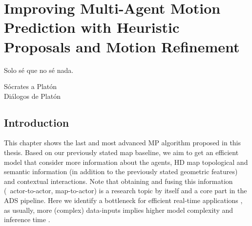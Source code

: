 % 
% 
% 
% 
% 
% 
% 

\chapter{Improving Multi-Agent Motion Prediction with Heuristic Proposals and Motion Refinement}
\label{cha:improving_multi_agent}

\begin{FraseCelebre}
	\begin{Frase}
		Solo sé que no sé nada.
	\end{Frase}
	\begin{Fuente}
		Sócrates a Platón \\
		Diálogos de Platón
	\end{Fuente}
\end{FraseCelebre}

\section{Introduction}
\label{sec:7_introduction}

This chapter shows the last and most advanced \ac{MP} algorithm proposed in this thesis. Based on our previously stated map baseline, we aim to get an efficient model that consider more information about the agents, HD map topological and semantic information (in addition to the previously stated geometric features) and contextual interactions. Note that obtaining and fusing this information (\eg \ actor-to-actor, map-to-actor) is a research topic by itself \cite{varadarajan2022multipath++, zeng2021lanercnn, liang2020learning} and a core part in the \ac{ADS} pipeline. Here we identify a bottleneck for efficient real-time applications \cite{KATRAKAZAS2015416realtime, gomez2021smartmot}, as usually, more (complex) data-inputs implies higher model complexity and inference time \cite{gao2020vectornet}. 

